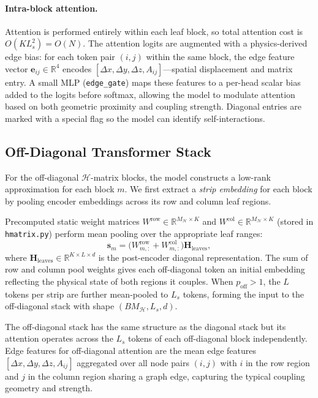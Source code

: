 \documentclass[acmtog,anonymous,review]{acmart}
\begin{document}
\paragraph{Intra-block attention.}
Attention is performed entirely within each leaf block, so total attention cost is
$O(K L_s^2) = O(N)$.  The attention logits are augmented with a physics-derived edge bias: for
each token pair $(i, j)$ within the same block, the edge feature vector $\mathbf{e}_{ij} \in
\mathbb{R}^4$ encodes $[\Delta x, \Delta y, \Delta z, A_{ij}]$---spatial displacement and matrix
entry.  A small MLP (\texttt{edge\_gate}) maps these features to a per-head scalar bias added to
the logits before softmax, allowing the model to modulate attention based on both geometric
proximity and coupling strength.  Diagonal entries are marked with a special flag so the model
can identify self-interactions.

\subsection{Off-Diagonal Transformer Stack}
\label{sec:method:offdiag}

For the off-diagonal $\mathcal{H}$-matrix blocks, the model constructs a low-rank approximation
for each block $m$.  We first extract a \emph{strip embedding} for each block by pooling encoder
embeddings across its row and column leaf regions.

Precomputed static weight matrices $W^\mathrm{row} \in \mathbb{R}^{M_\mathcal{H} \times K}$ and
$W^\mathrm{col} \in \mathbb{R}^{M_\mathcal{H} \times K}$ (stored in \texttt{hmatrix.py}) perform
mean pooling over the appropriate leaf ranges:
\begin{equation}
  \mathbf{s}_m = \bigl(W^\mathrm{row}_{m,:} + W^\mathrm{col}_{m,:}\bigr)
    \mathbf{H}_\mathrm{leaves},
  \label{eq:strip}
\end{equation}
where $\mathbf{H}_\mathrm{leaves} \in \mathbb{R}^{K \times L \times d}$ is the post-encoder
diagonal representation.  The sum of row and column pool weights gives each off-diagonal token an
initial embedding reflecting the physical state of both regions it couples.  When
$p_\mathrm{off} > 1$, the $L$ tokens per strip are further mean-pooled to $L_s$ tokens, forming
the input to the off-diagonal stack with shape $(B M_\mathcal{H}, L_s, d)$.

The off-diagonal stack has the same structure as the diagonal stack but its attention operates
across the $L_s$ tokens of each off-diagonal block independently.  Edge features for off-diagonal
attention are the mean edge features $[\Delta x, \Delta y, \Delta z, A_{ij}]$ aggregated over all
node pairs $(i, j)$ with $i$ in the row region and $j$ in the column region sharing a graph edge,
capturing the typical coupling geometry and strength.
\end{document}
